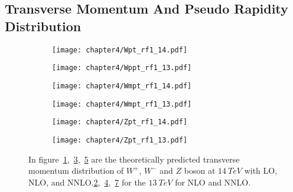 \documentclass[a4paper,12pt]{report}
\numberwithin{equation}{section}
\begin{document}
\subsection{Transverse Momentum And Pseudo Rapidity Distribution}

\begin{figure}[H]
\centering
\begin{subfigure}{0.49\textwidth}
\texttt{[image: chapter4/Wpt\_rf1\_14.pdf]}
\vspace*{-8mm}
\caption{}
\label{pt141}
\end{subfigure}
\begin{subfigure}{0.49\textwidth}
\texttt{[image: chapter4/Wppt\_rf1\_13.pdf]}
\vspace*{-8mm}
\caption{}
\label{pt131}
\end{subfigure}
\begin{subfigure}{0.49\textwidth}
\texttt{[image: chapter4/Wmpt\_rf1\_14.pdf]}
\vspace*{-8mm}
\caption{}
\label{pt142}
\end{subfigure}
\begin{subfigure}{0.49\textwidth}
\texttt{[image: chapter4/Wmpt\_rf1\_13.pdf]}
\vspace*{-8mm}
\caption{}
\label{pt132}
\end{subfigure}
\begin{subfigure}{0.49\textwidth}
\texttt{[image: chapter4/Zpt\_rf1\_14.pdf]}
\vspace*{-8mm}
\caption{}
\label{pt143}
\end{subfigure}
\begin{subfigure}{0.49\textwidth}
\texttt{[image: chapter4/Zpt\_rf1\_13.pdf]}
\vspace*{-8mm}
\caption{}
\label{pt133}
\end{subfigure}
\caption{In figure~\ref{pt141},~\ref{pt142},~\ref{pt143} are the theoretically predicted transverse momentum distribution of $W^{+}$, $W^{-}$ and $Z$ boson at $14~TeV$ with LO, NLO, and NNLO.\ref{pt131},~\ref{pt132},~\ref{pt133} for the $13~TeV$ for NLO and NNLO.}  
\end{figure}
\end{document}
